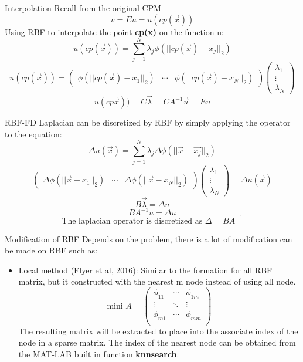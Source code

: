 \documentclass{beamer}
\begin{document}
\begin{frame}{Interpolation}
    Recall from the original CPM
    $$
    v = Eu = u(cp(\vec{x}))
    $$
    Using RBF to interpolate the point \textbf{cp(x)} on the function u:
    $$
    u(cp(\vec{x}))  = \sum_{j=1}^N\lambda_j\phi(||cp(\vec{x})-x_j||_2)
    $$
    $$
    u(cp(\vec{x})) = 
    \begin{pmatrix}
    \phi(||cp(\vec{x})-x_1||_2) & \cdots & \phi(||cp(\vec{x})-x_N||_2)
    \end{pmatrix}
    \begin{pmatrix}
    \lambda_1 \\ \vdots \\ \lambda_N
    \end{pmatrix}
    $$
    $$
    u(cp\vec{x})) = C\vec{\lambda} =CA^{-1}\vec{u} = Eu
    $$
\end{frame}

\begin{frame}{RBF-FD}
    Laplacian can be discretized by RBF by simply applying the operator to the equation:
    $$ 
    \Delta u(\vec{x}) = \sum_{j=1}^N\lambda_j\Delta\phi(||\vec{x}-\vec{x_j}||_2)
    $$
    $$
    \begin{pmatrix}\Delta\phi(||\vec{x}-x_1||_2) &
    \cdots & \Delta\phi(||\vec{x}-x_N||_2)\end{pmatrix} 
    \begin{pmatrix}\lambda_1  \\ \vdots \\ \lambda_N\end{pmatrix} = \Delta u(\vec{x})
    $$
    $$B\vec{\lambda}=\Delta u$$
    $$BA^{-1}u=\Delta u$$
    $$\text{The laplacian operator is discretized as } \Delta = BA^{-1}$$
\end{frame}

\begin{frame}{Modification of RBF}
    Depends on the problem, there is a lot of modification can be made on RBF such as:
    \begin{itemize}
        \item \alert{Local method} (Flyer et al, 2016):
        \nextline Similar to the formation for all RBF matrix, but it constructed with the nearest m node instead of using all node.
        $$\text{mini }A = 
        \begin{pmatrix}
        \phi_{11}   & \cdots    & \phi_{1m} \\
        \vdots      & \ddots    & \vdots    \\
        \phi_{m1}   & \cdots    & \phi_{mm} \\
        \end{pmatrix}$$
        The resulting matrix will be extracted to place into the associate index of the node in a sparse matrix. The index of the nearest node can be obtained from the MAT-LAB built in function \textbf{knnsearch}.
    \end{itemize}
\end{frame}
\end{document}
